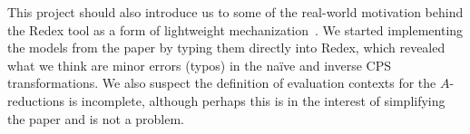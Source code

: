 \documentclass[11pt]{article}
\begin{document}
This project should also introduce us to some of the real-world motivation
behind the Redex tool as a form of lightweight
mechanization~\cite{Klein:2012uq}. We started implementing the models from the
paper by typing them directly into Redex, which revealed what we think are
minor errors (typos) in the na\"{i}ve and inverse CPS transformations. We also
suspect the definition of evaluation contexts for the $A$-reductions is
incomplete, although perhaps this is in the interest of simplifying the paper
and is not a problem.
%



\pagebreak



\end{document}
